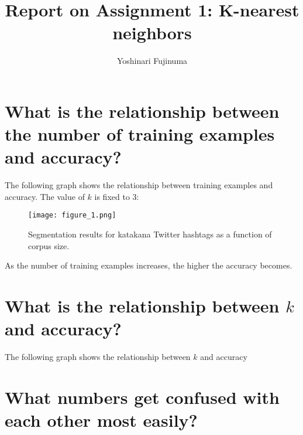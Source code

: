 \documentclass[11pt]{article}
\begin{document}
\title{Report on Assignment 1: K-nearest neighbors}
\author{Yoshinari Fujinuma}
\maketitle

\section{What is the relationship between the number of training examples and accuracy?}
The following graph shows the relationship between training examples and accuracy. The value of $k$ is fixed to $3$:
\begin{figure}[htb]
   \begin{center}
    \scalebox{0.5}
     {\texttt{[image: figure\_1.png]}}
    \end{center}
    \caption{Segmentation results for katakana Twitter hashtags as a function of corpus size.}
    \label{fig:corpus_size}
\end{figure}
As the number of training examples increases, the higher the accuracy becomes.

\section{What is the relationship between $k$ and accuracy?}
The following graph shows the relationship between $k$ and accuracy
\section{What numbers get confused with each other most easily?}
\end{document}
